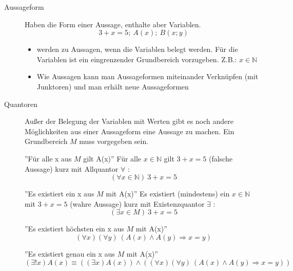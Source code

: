 \begin{description}
    \item[Aussageform] Haben die Form einer Aussage, enthalte aber Variablen.
    \[3 + x = 5;\ A(x);\ B(x;y)\]
    \begin{itemize}
        \item werden zu Aussagen, wenn die Variablen belegt werden. Für die Variablen ist ein eingrenzender Grundbereich vorzugeben. Z.B.: $x \in \mathbb{N}$
        \item Wie Aussagen kann man Aussageformen miteinander Verknüpfen (mit Junktoren) und man erhält neue Aussageformen
    \end{itemize}
    \item[Quantoren] Außer der Belegung der Variablen mit Werten gibt es noch andere Möglichkeiten aus einer Aussageform eine Aussage zu machen. Ein Grundbereich $M$ muss vorgegeben sein.

    ''Für alle x aus $M$ gilt A(x)'' \newline
    Für alle $x \in \mathbb{N}$ gilt $3 + x = 5$ (falsche Aussage) kurz mit Allquantor $\forall$ :
    \[(\forall x \in \mathbb{N})\ 3 + x = 5\]

    ''Es existiert ein x aus $M$ mit A(x)'' \newline
    Es existiert (mindestens) ein $x \in \mathbb{N}$ mit $3 + x = 5$ (wahre Aussage) kurz mit Existenzquantor $\exists$ :
    \[(\exists x \in M)\ 3 + x = 5\]

    ''Es existiert höchsten ein x aus $M$ mit A(x)''
    \[(\forall x)(\forall y)\ (A(x) \wedge A(y) \Rightarrow x = y)\]

    ''Es existiert genau ein x aus $M$ mit A(x)''
    \[(\exists ! x) A(x) \equiv ((\exists x) A(x)) \wedge ((\forall x)(\forall y)\ (A(x) \wedge A(y) \Rightarrow x = y))\]
\end{description}
